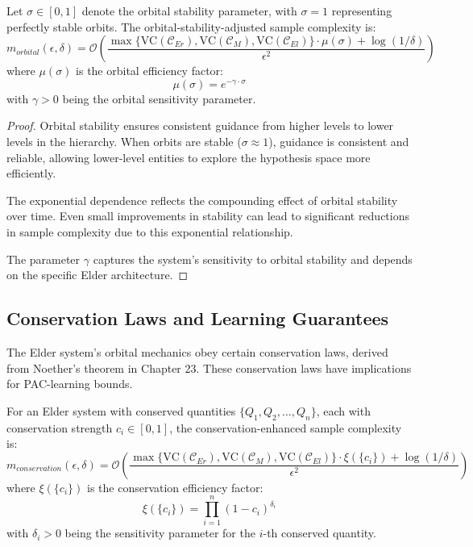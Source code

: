 \begin{theorem}
Let $\sigma \in [0, 1]$ denote the orbital stability parameter, with $\sigma = 1$ representing perfectly stable orbits. The orbital-stability-adjusted sample complexity is:
\begin{equation}
m_{orbital}(\epsilon, \delta) = \mathcal{O}\left(\frac{\max\{\text{VC}(\mathcal{C}_{Er}), \text{VC}(\mathcal{C}_{M}), \text{VC}(\mathcal{C}_{El})\} \cdot \mu(\sigma) + \log(1/\delta)}{\epsilon^2}\right)
\end{equation}
where $\mu(\sigma)$ is the orbital efficiency factor:
\begin{equation}
\mu(\sigma) = e^{-\gamma \cdot \sigma}
\end{equation}
with $\gamma > 0$ being the orbital sensitivity parameter.
\end{theorem}

\begin{proof}
Orbital stability ensures consistent guidance from higher levels to lower levels in the hierarchy. When orbits are stable ($\sigma \approx 1$), guidance is consistent and reliable, allowing lower-level entities to explore the hypothesis space more efficiently.

The exponential dependence reflects the compounding effect of orbital stability over time. Even small improvements in stability can lead to significant reductions in sample complexity due to this exponential relationship.

The parameter $\gamma$ captures the system's sensitivity to orbital stability and depends on the specific Elder architecture.
\end{proof}

\subsection{Conservation Laws and Learning Guarantees}

The Elder system's orbital mechanics obey certain conservation laws, derived from Noether's theorem in Chapter 23. These conservation laws have implications for PAC-learning bounds.

\begin{theorem}
For an Elder system with conserved quantities $\{Q_1, Q_2, \ldots, Q_n\}$, each with conservation strength $c_i \in [0, 1]$, the conservation-enhanced sample complexity is:
\begin{equation}
m_{conservation}(\epsilon, \delta) = \mathcal{O}\left(\frac{\max\{\text{VC}(\mathcal{C}_{Er}), \text{VC}(\mathcal{C}_{M}), \text{VC}(\mathcal{C}_{El})\} \cdot \xi(\{c_i\}) + \log(1/\delta)}{\epsilon^2}\right)
\end{equation}
where $\xi(\{c_i\})$ is the conservation efficiency factor:
\begin{equation}
\xi(\{c_i\}) = \prod_{i=1}^{n} (1 - c_i)^{\delta_i}
\end{equation}
with $\delta_i > 0$ being the sensitivity parameter for the $i$-th conserved quantity.
\end{theorem}

